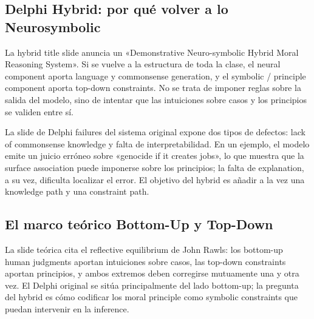 
\subsection{Delphi Hybrid: por qué volver a lo Neurosymbolic}

La hybrid title slide anuncia un «Demonstrative Neuro-symbolic Hybrid Moral Reasoning System». Si se vuelve a la estructura de toda la clase, el neural component aporta language y commonsense generation, y el symbolic / principle component aporta top-down constraints. No se trata de imponer reglas sobre la salida del modelo, sino de intentar que las intuiciones sobre casos y los principios se validen entre sí.


La slide de Delphi failures del sistema original expone dos tipos de defectos: lack of commonsense knowledge y falta de interpretabilidad. En un ejemplo, el modelo emite un juicio erróneo sobre «genocide if it creates jobs», lo que muestra que la surface association puede imponerse sobre los principios; la falta de explanation, a su vez, dificulta localizar el error. El objetivo del hybrid es añadir a la vez una knowledge path y una constraint path.


\subsection{El marco teórico Bottom-Up y Top-Down}

La slide teórica cita el reflective equilibrium de John Rawls: los bottom-up human judgments aportan intuiciones sobre casos, las top-down constraints aportan principios, y ambos extremos deben corregirse mutuamente una y otra vez. El Delphi original se sitúa principalmente del lado bottom-up; la pregunta del hybrid es cómo codificar los moral principle como symbolic constraints que puedan intervenir en la inference.

